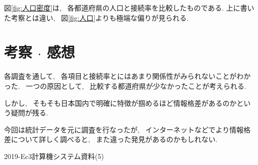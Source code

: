 \documentclass{jsarticle}
\begin{document}
        図\ref{fig:人口密度}は, ~各都道府県の人口と接続率を比較したものである.
        上に書いた考察とは違い,
        ~図\ref{fig:人口}よりも極端な偏りが見られる.

\section{考察 $\cdot$ 感想}
    各調査を通して, ~各項目と接続率とにはあまり関係性がみられないことがわかった.
    ~一つの原因として, ~比較する都道府県が少なかったことが考えられる.

    しかし, ~そもそも日本国内で明確に特徴が掴めるほど情報格差があるのかという疑問が残る.

    今回は統計データを元に調査を行なったが,
    ~インターネットなどでより情報格差について詳しく調べると,
    ~また違った発見があるのかもしれない.

\begin{thebibliography}{}
     2019-Ec3計算機システム資料(5)
\end{thebibliography}
\end{document}
